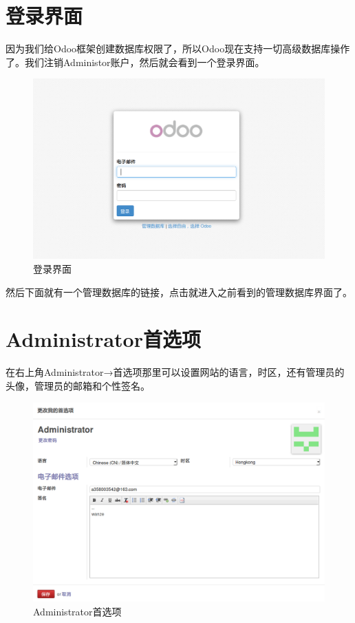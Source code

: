 \documentclass[11pt,a4paper]{sphinxmanual}
\begin{document}
\section{登录界面}
\label{sec-4-2}
因为我们给Odoo框架创建数据库权限了，所以Odoo现在支持一切高级数据库操作了。我们注销Administor账户，然后就会看到一个登录界面。

\begin{figure}[H]
\centering
\includegraphics[keepaspectratio,max width=0.95\linewidth]{images/登录界面.png}
\caption{登录界面}
\end{figure}

然后下面就有一个管理数据库的链接，点击就进入之前看到的管理数据库界面了。


\section{Administrator首选项}
\label{sec-4-3}
在右上角Administrator→首选项那里可以设置网站的语言，时区，还有管理员的头像，管理员的邮箱和个性签名。

\begin{figure}[H]
\centering
\includegraphics[keepaspectratio,max width=0.95\linewidth]{images/Administrator首选项.png}
\caption{Administrator首选项}
\end{figure}
\end{document}
